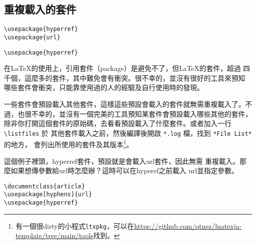 \subsection{重複載入的套件}

\begin{Wrong}
\begin{verbatim}
\usepackage{hyperref}
\usepackage{url}
\end{verbatim}

\end{Wrong}

\begin{Right}
\begin{verbatim}
\usepackage{hyperref}
\end{verbatim}

\end{Right}

在\LaTeX 的使用上，引用套件（package）是避免不了，但\LaTeX 的套件，超過
四千個，這麼多的套件，其中難免會有衝突。很不幸的，並沒有很好的工具來預知
哪些套件會衝突，只能靠使用過的人的經驗及自行使用時的發現。

一些套件會預設載入其他套件，這樣這些預設會載入的套件就無需重複載入了。不
過，也很不幸的，並沒有一個完美的工具預知某套件會預設載入哪些其他的套件，
除非你打開這個套件的原始碼，去看看預設載入了什麼套件。或者加入一行 \verb|\listfiles| 於
其他套件載入之前，然後編譯後開啟 \verb|*.log| 檔，找到 \verb|*File List*| 的地方，
會列出所使用的套件及其版本\footnote{有一個很dirty的小程式{\tt ltxpkg}，可以在\url{https://github.com/qtnez/luatexja-template/tree/main/tools}找到。}。

這個例子裡頭，{\sf hyperref}套件，預設就是會載入{\sf url}套件，因此無需
重複載入。那麼如果想傳參數給{\sf url}時怎麼辦？這時可以在{\sf hyperef}之前載入
{\sf url}並指定參數。

\begin{Code}
\begin{verbatim}
\documentclass{article}
\usepackage[hyphens]{url}
\usepackage{hyperref}
\end{verbatim}
\end{Code}

\marginpar{\back}
